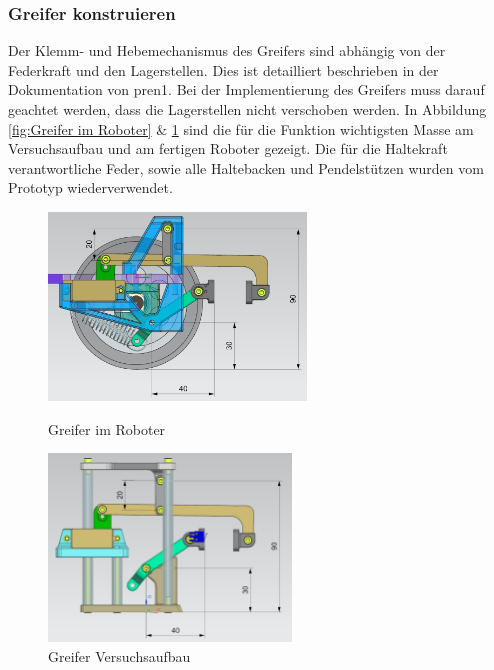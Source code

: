 \subsubsection{Greifer konstruieren}
\label{Greifer konstruieren}

Der Klemm- und Hebemechanismus des Greifers sind abhängig von der Federkraft und den Lagerstellen. Dies ist detailliert beschrieben in der Dokumentation von \acrshort{pren1}. Bei der Implementierung des Greifers muss darauf geachtet werden, dass die Lagerstellen nicht verschoben werden. In Abbildung \ref{fig:Greifer im Roboter} \& \ref{fig:Greifer Versuchsaufbau} sind die für die Funktion wichtigsten Masse am Versuchsaufbau und am fertigen Roboter gezeigt. Die für die Haltekraft verantwortliche Feder, sowie alle Haltebacken und Pendelstützen wurden vom Prototyp wiederverwendet. 

\begin{figure}[H]
  \centering
  \begin{minipage}[b]{0.45\textwidth}
    \centering
    \includegraphics[height=5cm]{assets/MT/Greifer Montiert.png}
    \caption{Greifer im Roboter}
    \label{fig:Greifer im Roboter}
  \end{minipage}
  \hfill
  \begin{minipage}[b]{0.45\textwidth}
    \centering
    \includegraphics[height=5cm]{assets/MT/Greifer Prototyp.png}
    \caption{Greifer Versuchsaufbau}
    \label{fig:Greifer Versuchsaufbau}
  \end{minipage}
\end{figure}

